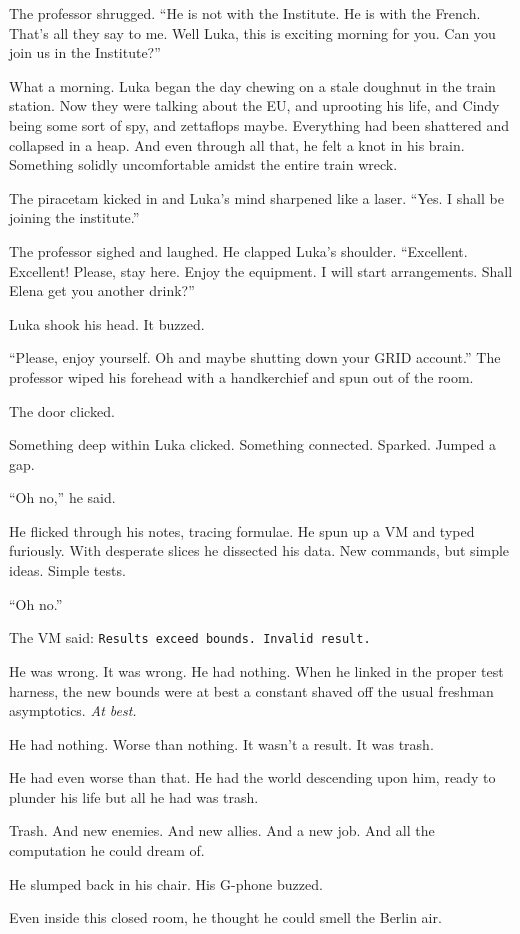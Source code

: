 \documentclass[ebook,11pt,oneside,openany]{memoir}
\begin{document}
The professor shrugged. ``He is not with the Institute. He is with the French. That's all they say to me. Well Luka, this is exciting morning for you. Can you join us in the Institute?''

What a morning. Luka began the day chewing on a stale doughnut in the train station. Now they were talking about the EU, and uprooting his life, and Cindy being some sort of spy, and zettaflops maybe. Everything had been shattered and collapsed in a heap. And even through all that, he felt a knot in his brain. Something solidly uncomfortable amidst the entire train wreck.

The piracetam kicked in and Luka's mind sharpened like a laser. ``Yes. I shall be joining the institute.''

The professor sighed and laughed. He clapped Luka's shoulder. ``Excellent. Excellent! Please, stay here. Enjoy the equipment. I will start arrangements. Shall Elena get you another drink?''

Luka shook his head. It buzzed.

``Please, enjoy yourself. Oh and maybe shutting down your GRID account.'' The professor wiped his forehead with a handkerchief and spun out of the room.

The door clicked.

Something deep within Luka clicked. Something connected. Sparked. Jumped a gap.

``Oh no,'' he said.

He flicked through his notes, tracing formulae. He spun up a VM and typed furiously. With desperate slices he dissected his data. New commands, but simple ideas. Simple tests.

``Oh no.''

The VM said: \texttt{Results exceed bounds. Invalid result.}

He was wrong. It was wrong. He had nothing. When he linked in the proper test harness, the new bounds were at best a constant shaved off the usual freshman asymptotics. \textit{At best.}

He had nothing. Worse than nothing. It wasn't a result. It was trash.

He had even worse than that. He had the world descending upon him, ready to plunder his life but all he had was trash.

Trash. And new enemies. And new allies. And a new job. And all the computation he could dream of.

He slumped back in his chair. His G-phone buzzed.

Even inside this closed room, he thought he could smell the Berlin air.
\end{document}
